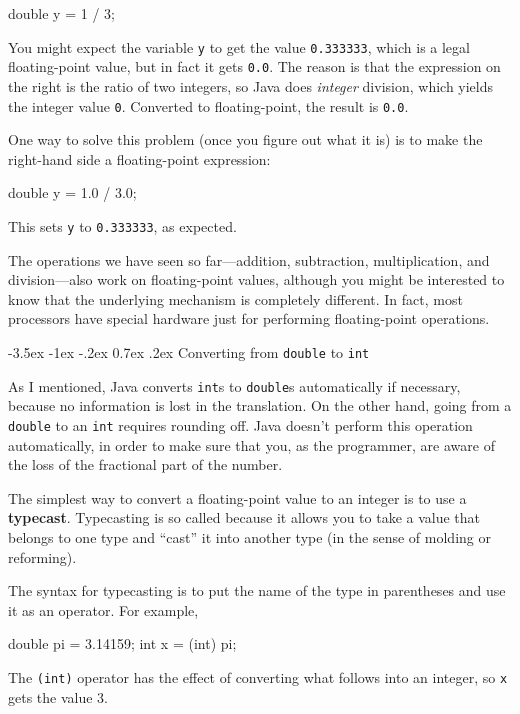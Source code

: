 \documentclass{book}
\makeatletter
\renewcommand{\section}{\@startsection 
    {section} {1} {0mm}%
    {-3.5ex \@plus -1ex \@minus -.2ex}%
    {0.7ex \@plus.2ex}%
    {\normalfont\Large\bfseries}}
\makeatother
\begin{document}
\begin{verbatimtab}
    double y = 1 / 3;
\end{verbatimtab}
%
You might expect the variable {\tt y} to get the value
{\tt 0.333333}, which is a legal floating-point value, but in
fact it gets {\tt 0.0}.  The reason is that the
expression on the right is the ratio of two integers,
so Java does {\em integer} division, which yields the integer
value {\tt 0}.  Converted to floating-point, the result is
{\tt 0.0}.

One way to solve this problem (once you figure out what
it is) is to make the right-hand side a floating-point
expression:

\begin{verbatimtab}
    double y = 1.0 / 3.0;
\end{verbatimtab}
%
This sets {\tt y} to {\tt 0.333333}, as expected.


The operations we have seen so far---addition, subtraction,
multiplication, and division---also work on floating-point values,
although you might be interested to know that the underlying mechanism
is completely different.  In fact, most processors have special
hardware just for performing floating-point operations.


\section{Converting from {\tt double} to {\tt int}}
\label{rounding}

As I mentioned, Java converts {\tt int}s
to {\tt double}s automatically if necessary, because no
information is lost in the translation.  On the other hand,
going from a {\tt double} to an {\tt int} requires rounding
off.  Java doesn't perform this operation automatically, in
order to make sure that you, as the programmer, are aware
of the loss of the fractional part of the number.

The simplest way to convert a floating-point value to an integer is to
use a {\bf typecast}.  Typecasting is so called because it allows you
to take a value that belongs to one type and ``cast'' it into another
type (in the sense of molding or reforming).

The syntax for typecasting is to put
the name of the type in parentheses and use it as an operator.
For example,

\begin{verbatimtab}
    double pi = 3.14159;
    int x = (int) pi;
\end{verbatimtab}
%
The {\tt(int)} operator has the effect of converting what
follows into an integer, so {\tt x} gets the value 3.
\end{document}
